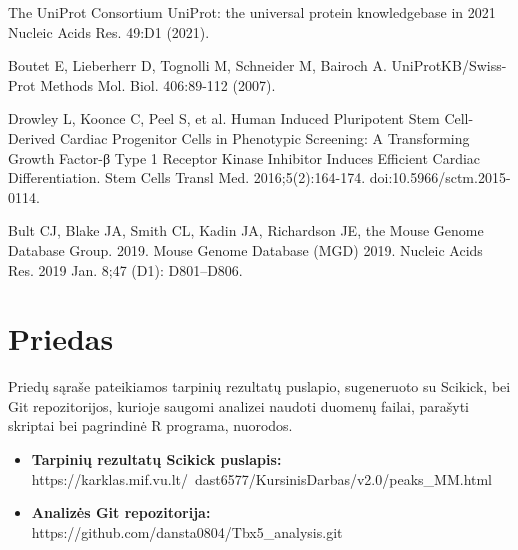 \documentclass[12pt]{article}
\begin{document}
\begin{thebibliography}{99}
 The UniProt Consortium UniProt: the universal protein
knowledgebase in 2021 Nucleic Acids Res. 49:D1 (2021).

 Boutet E, Lieberherr D, Tognolli M, Schneider M, Bairoch A.
UniProtKB/Swiss-Prot Methods Mol. Biol. 406:89-112 (2007).

 Drowley L, Koonce C, Peel S, et al. Human
Induced Pluripotent Stem Cell-Derived Cardiac Progenitor Cells in Phenotypic
Screening: A Transforming Growth Factor-β Type 1 Receptor Kinase Inhibitor
Induces Efficient Cardiac Differentiation. Stem Cells Transl Med.
2016;5(2):164-174. doi:10.5966/sctm.2015-0114.

 Bult CJ, Blake JA, Smith CL, Kadin JA, Richardson JE, the
Mouse Genome Database Group. 2019. Mouse Genome Database (MGD) 2019.
Nucleic Acids Res. 2019 Jan. 8;47 (D1): D801–D806.

\end{thebibliography}

\newpage


\section{Priedas}

Priedų sąraše pateikiamos tarpinių rezultatų puslapio, sugeneruoto su Scikick,
bei Git repozitorijos, kurioje saugomi analizei naudoti duomenų failai,
parašyti skriptai bei pagrindinė R programa, nuorodos.

\begin{itemize}
    \item \textbf{Tarpinių rezultatų Scikick puslapis:}\\
        https://karklas.mif.vu.lt/~dast6577/KursinisDarbas/v2.0/peaks\_MM.html
    \item \textbf{Analizės Git repozitorija:}\\
        https://github.com/dansta0804/Tbx5\_analysis.git
  \end{itemize}
\end{document}
